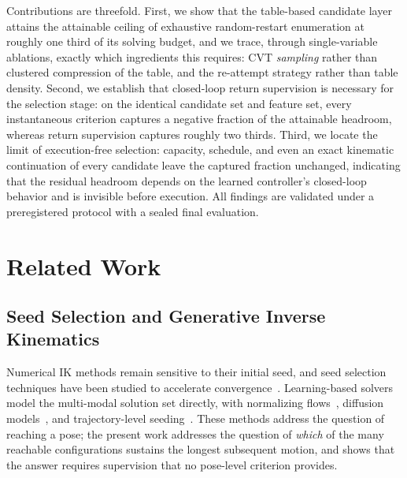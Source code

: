 \documentclass[journal]{IEEEtran}
\begin{document}
Contributions are threefold. First, we show that the table-based
candidate layer attains the attainable ceiling of exhaustive
random-restart enumeration at roughly one third of its solving budget,
and we trace, through single-variable ablations, exactly which
ingredients this requires: CVT \textit{sampling} rather than clustered
compression of the table, and the re-attempt strategy rather than table
density. Second, we establish that closed-loop return supervision is
necessary for the selection stage: on the identical candidate set and
feature set, every instantaneous criterion captures a negative fraction
of the attainable headroom, whereas return supervision captures roughly
two thirds. Third, we locate the limit of execution-free selection:
capacity, schedule, and even an exact kinematic continuation of every
candidate leave the captured fraction unchanged, indicating that the
residual headroom depends on the learned controller's closed-loop
behavior and is invisible before execution. All findings are validated
under a preregistered protocol with a sealed final evaluation.

\section{Related Work}

\subsection{Seed Selection and Generative Inverse Kinematics}
Numerical IK methods remain sensitive to their initial seed, and seed
selection techniques have been studied to accelerate
convergence~\cite{yuan2026iksel}. Learning-based solvers model the
multi-modal solution set directly, with normalizing
flows~\cite{ames2022ikflow}, diffusion models~\cite{zhang2025ikdiffuser},
and trajectory-level seeding~\cite{huang2024diffusionseeder}. These
methods address the question of reaching a pose; the present work
addresses the question of \textit{which} of the many reachable
configurations sustains the longest subsequent motion, and shows that
the answer requires supervision that no pose-level criterion provides.
\end{document}
